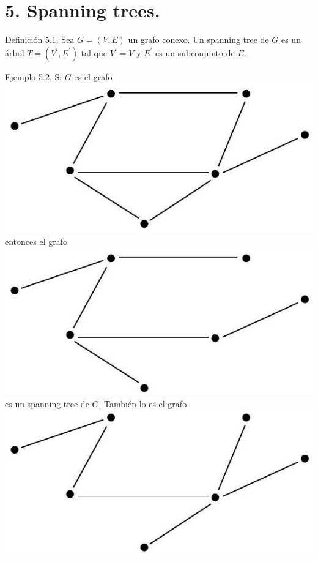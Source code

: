 \documentclass[10pt]{article}
\begin{document}
\section*{5. Spanning trees.}
Definición 5.1. Sea $G=(V, E)$ un grafo conexo. Un spanning tree de $G$ es un árbol $T=\left(V^{\prime}, E^{\prime}\right)$ tal que $V^{\prime}=V$ y $E^{\prime}$ es un subconjunto de $E$.

Ejemplo 5.2. Si $G$ es el grafo\\
\includegraphics[max width=\textwidth, center]{2025_09_05_93c7c1835f249f70c0eeg-13}\\
entonces el grafo\\
\includegraphics[max width=\textwidth, center]{2025_09_05_93c7c1835f249f70c0eeg-13(1)}\\
es un spanning tree de $G$. También lo es el grafo\\
\includegraphics[max width=\textwidth, center]{2025_09_05_93c7c1835f249f70c0eeg-13(2)}
\end{document}

